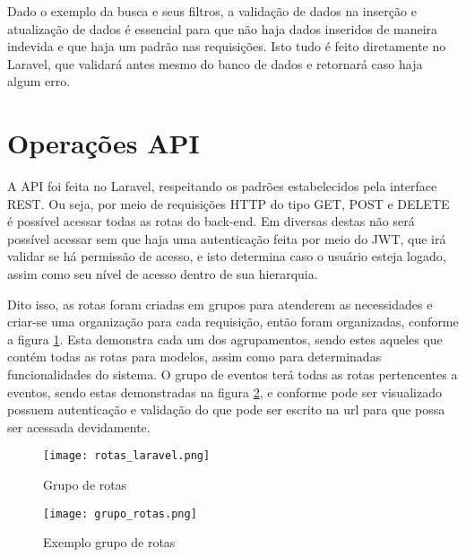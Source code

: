 Dado o exemplo da busca e seus filtros, a validação de dados na inserção e atualização de dados é essencial para que não haja dados inseridos de maneira indevida e que haja um padrão nas requisições. Isto tudo é feito diretamente no Laravel, que validará antes mesmo do banco de dados e retornará caso haja algum erro.
\section{Operações API}
A API foi feita no Laravel, respeitando os padrões estabelecidos pela interface REST. Ou seja, por meio de requisições HTTP do tipo GET, POST e DELETE é possível acessar todas as rotas do back-end. Em diversas destas não será possível acessar sem que haja uma autenticação feita por meio do JWT, que irá validar se há permissão de acesso, e isto determina caso o usuário esteja logado, assim como seu nível de acesso dentro de sua hierarquia. 

Dito isso, as rotas foram criadas em grupos para atenderem as necessidades e criar-se uma organização para cada requisição, então foram organizadas, conforme a figura \ref{rotas_laravel}. Esta demonstra cada um dos agrupamentos, sendo estes aqueles que contém todas as rotas para modelos, assim como para determinadas funcionalidades do sistema. O grupo de eventos terá todas as rotas pertencentes a eventos, sendo estas demonstradas na figura \ref{grupo_rotas}, e conforme pode ser visualizado possuem autenticação e validação do que pode ser escrito na url para que possa ser acessada devidamente. 
\begin{figure}[h]
    \caption{\label{rotas_laravel}Grupo de rotas}
    \vspace{5pt}
    \centering
    \texttt{[image: rotas\_laravel.png]}
    \vspace{5pt}
\end{figure}
\begin{figure}[h]
    \caption{\label{grupo_rotas}Exemplo grupo de rotas}
    \vspace{5pt}
    \centering
    \texttt{[image: grupo\_rotas.png]}
    \vspace{5pt}
\end{figure}

